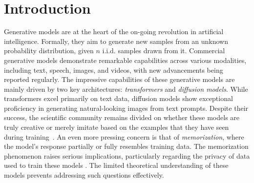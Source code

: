 \section{Introduction}
Generative models are at the heart of the on-going revolution in artificial intelligence. Formally, they aim to generate new samples from an unknown probability distribution, given
$n$ i.i.d. samples drawn from it.
Commercial generative models demonstrate remarkable capabilities across various modalities, including text, speech, images, and videos, with new advancements being reported regularly. 
The impressive capabilities of these generative models are mainly driven by two key architectures: \textit{transformers} and \textit{diffusion models}. While transformers excel primarily on text data, diffusion models show exceptional proficiency in generating natural-looking images from text prompts. Despite their success, the scientific community remains divided on whether these models are truly creative or merely imitate based on the examples that they have seen during training~\cite{ukpaka_creative_2024,kamb_analytic_2024}. An even more pressing concern is that of \textit{memorization}, where the model's response  partially or fully resembles training data. The memorization phenomenon raises serious implications, particularly regarding the privacy of data used to train these models \cite{carlini_extracting_2021, carlini_extracting_2023}. The limited theoretical understanding of these models prevents addressing such questions effectively. 



